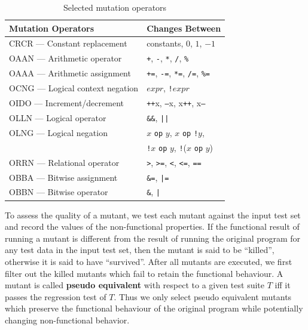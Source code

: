 \begin{table}[t]
\caption{Selected mutation operators}
\label{tab:cmop} 
\begin{center}
\begin{tabular}{ | l | l |}
  \hline
  Mutation Operators & Changes Between \\ 
\hline
 CRCR --- Constant replacement & constants, $0$, $1$, $-1$ \\
 OAAN --- Arithmetic operator & \texttt{+}, \texttt{-}, \texttt{*}, \texttt{/}, \texttt{\%} \\
 OAAA --- Arithmetic assignment & \texttt{+=}, \texttt{-=}, \texttt{*=}, \texttt{/=}, \texttt{\%=} \\
 OCNG --- Logical context negation & $expr$, \texttt{!}$expr$ \\
 OIDO --- Increment/decrement & \texttt{++}x, \texttt{--}x, x\texttt{++}, x\texttt{--} \\
  OLLN --- Logical operator & \texttt{\&\&}, \texttt{||} \\ 
  OLNG --- Logical negation & $x$ \texttt{op} $y$, $x$ \texttt{op} \texttt{!}$y$,
  \\
  & \texttt{!}$x$ \texttt{op} $y$, \texttt{!}($x$ \texttt{op} $y$)\\
  ORRN --- Relational operator & \texttt{>}, \texttt{>=}, \texttt{<}, \texttt{<=}, \texttt{==} \\
  OBBA --- Bitwise assignment & \texttt{\&=}, \texttt{|=} \\
  OBBN --- Bitwise operator & \texttt{\&}, \texttt{|} \\
\hline
\end{tabular} 
\end{center} 
\end{table} 

To assess the quality of a mutant, we test each mutant against the input test set and record the values of the non-functional properties. If the functional result of running a mutant is different from the result of running the original program for any test data in the input test set, then the mutant is said to be ``killed'', otherwise it is said to have ``survived''. 
After all mutants are executed, we first filter out the killed mutants
which fail to retain the functional behaviour. A mutant is called
\textbf{pseudo equivalent} with respect to a given test suite $T$ iff it
passes the regression test of $T$.  Thus we only select pseudo equivalent
mutants which preserve the functional behaviour of the original program
while potentially changing non-functional behavior. 

